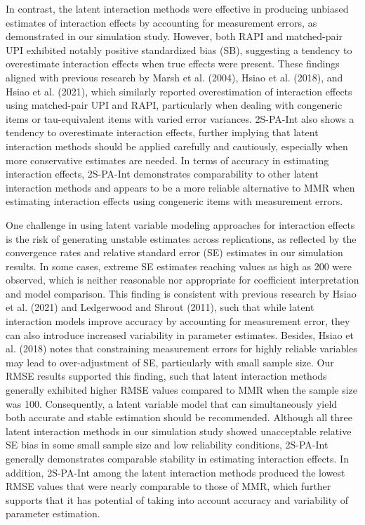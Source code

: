 \documentclass[
  man,mask]{apa6}
\begin{document}
In contrast, the latent interaction methods were effective in producing unbiased estimates of interaction effects by accounting for measurement errors, as demonstrated in our simulation study. However, both RAPI and matched-pair UPI exhibited notably positive standardized bias (SB), suggesting a tendency to overestimate interaction effects when true effects were present. These findings aligned with previous research by Marsh et al. (2004), Hsiao et al. (2018), and Hsiao et al. (2021), which similarly reported overestimation of interaction effects using matched-pair UPI and RAPI, particularly when dealing with congeneric items or tau-equivalent items with varied error variances. 2S-PA-Int also shows a tendency to overestimate interaction effects, further implying that latent interaction methods should be applied carefully and cautiously, especially when more conservative estimates are needed. In terms of accuracy in estimating interaction effects, 2S-PA-Int demonstrates comparability to other latent interaction methods and appears to be a more reliable alternative to MMR when estimating interaction effects using congeneric items with measurement errors.

One challenge in using latent variable modeling approaches for interaction effects is the risk of generating unstable estimates across replications, as reflected by the convergence rates and relative standard error (SE) estimates in our simulation results. In some cases, extreme SE estimates reaching values as high as 200 were observed, which is neither reasonable nor appropriate for coefficient interpretation and model comparison. This finding is consistent with previous research by Hsiao et al. (2021) and Ledgerwood and Shrout (2011), such that while latent interaction models improve accuracy by accounting for measurement error, they can also introduce increased variability in parameter estimates. Besides, Hsiao et al. (2018) notes that constraining measurement errors for highly reliable variables may lead to over-adjustment of SE, particularly with small sample size. Our RMSE results supported this finding, such that latent interaction methods generally exhibited higher RMSE values compared to MMR when the sample size was 100. Consequently, a latent variable model that can simultaneously yield both accurate and stable estimation should be recommended. Although all three latent interaction methods in our simulation study showed unacceptable relative SE bias in some small sample size and low reliability conditions, 2S-PA-Int generally demonstrates comparable stability in estimating interaction effects. In addition, 2S-PA-Int among the latent interaction methods produced the lowest RMSE values that were nearly comparable to those of MMR, which further supports that it has potential of taking into account accuracy and variability of parameter estimation.
\end{document}
